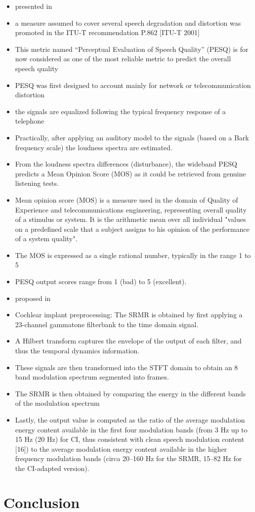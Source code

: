 \begin{itemize}
    \item presented in~
    \item a measure assumed to cover several speech degradation and distortion was promoted in the ITU-T recommendation P.862 [ITU-T 2001]
    \item This metric named “Perceptual Evaluation of Speech Quality” (PESQ) is for now considered as one of the most reliable metric to predict the overall speech quality
    \item PESQ was first designed to account mainly for network or telecommunication distortion
    \item the signals are equalized following the typical frequency response of a telephone
    \item Practically, after applying an auditory model to the signals (based on a Bark frequency scale) the loudness spectra are estimated.
    \item From the loudness spectra differences (disturbance), the wideband PESQ predicts a Mean Opinion Score (MOS) as it could be retrieved from genuine listening tests.
    \item Mean opinion score (MOS) is a measure used in the domain of Quality of Experience and telecommunications engineering, representing overall quality of a stimulus or system. It is the arithmetic mean over all individual "values on a predefined scale that a subject assigns to his opinion of the performance of a system quality".
    \item The MOS is expressed as a single rational number, typically in the range 1 to 5
    \item PESQ output scores range from 1 (bad) to 5 (excellent).
\end{itemize}

\begin{itemize}
    \item proposed in~
    \item Cochlear implant preprocessing: The SRMR is obtained by first applying a 23-channel gammatone filterbank to the time domain signal.
    \item A Hilbert transform captures the envelope of the output of each filter, and thus the temporal dynamics information.
    \item These signals are then transformed into the STFT domain to obtain an 8 band modulation spectrum segmented into frames.
    \item The SRMR is then obtained by comparing the energy in the different bands of the modulation spectrum
    \item Lastly, the output value is computed as the ratio of the average modulation energy content available in the first four modulation bands (from 3 Hz up to 15 Hz (20 Hz) for CI, thus consistent with clean speech modulation content [16])
         to the average modulation energy content available in the higher frequency modulation bands (circa 20–160 Hz for the SRMR, 15–82 Hz for the CI-adapted version).
\end{itemize}




\section{Conclusion}
